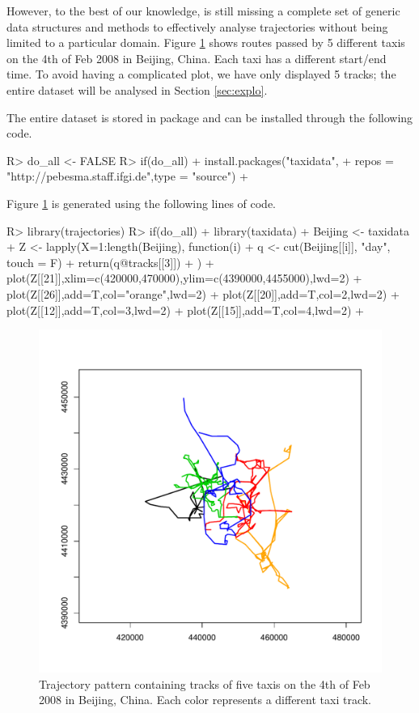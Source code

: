 \documentclass[article]{jss}
\begin{document}
However, to the best of our knowledge,  is still missing a complete set of generic data structures and methods to effectively analyse trajectories without being limited to a particular domain. Figure \ref{taxitracks} shows routes passed by 5 different taxis on the 4th of Feb 2008 in Beijing, China. Each taxi has a different start/end time. To avoid having a complicated plot, we have only displayed 5 tracks; the entire dataset will be analysed in Section \ref{sec:explo}.

The entire dataset is stored in  package    and can be installed through the following code.
\begin{Schunk}
\begin{Sinput}
R> do_all <- FALSE
R> if(do_all){
+   install.packages("taxidata", 
+   repos = "http://pebesma.staff.ifgi.de",type = "source") 
+  }
\end{Sinput}
\end{Schunk}

Figure \ref{taxitracks} is generated using the following lines of code.

\begin{Schunk}
\begin{Sinput}
R> library(trajectories)
R> if(do_all){
+    library(taxidata)
+  Beijing <- taxidata
+  Z <- lapply(X=1:length(Beijing), function(i){
+    q <-  cut(Beijing[[i]], "day", touch = F)
+    return(q@tracks[[3]])
+  })
+  plot(Z[[21]],xlim=c(420000,470000),ylim=c(4390000,4455000),lwd=2)
+  plot(Z[[26]],add=T,col="orange",lwd=2)
+  plot(Z[[20]],add=T,col=2,lwd=2)
+  plot(Z[[12]],add=T,col=3,lwd=2)
+  plot(Z[[15]],add=T,col=4,lwd=2)
+  }
\end{Sinput}
\end{Schunk}
\begin{figure}[!h]
\centering
\includegraphics[width=0.7\linewidth]{Tracks-ex.pdf}
\caption{Trajectory pattern containing tracks of five taxis on the 4th of Feb 2008 in Beijing, China. Each color represents a different taxi track.}
\label{taxitracks}
\end{figure}
\end{document}
